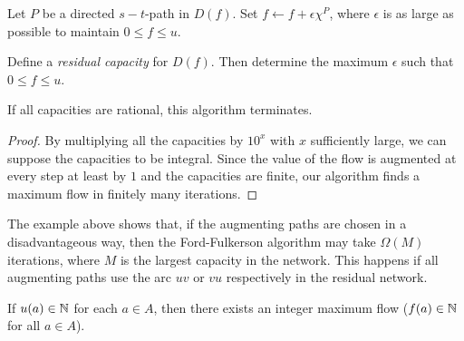 Let $P$ be a directed $s-t$-path in $D(f)$. Set $f \gets f + \epsilon\chi^P$, where
$\epsilon$ is as large as possible to maintain $0\leq f\leq u$. 

\begin{exercise}
   Define a \emph{residual capacity} for $D(f)$. Then determine 
   the maximum $\epsilon$ such that $0\leq f\leq u$.
\end{exercise}

\begin{theorem}
  \label{f:thr:9}
  If all capacities are rational, this algorithm terminates. 
\end{theorem}

\begin{proof}
   By multiplying all the capacities by $10^x$ with $x$ 
   sufficiently large, we can suppose the capacities to be 
   integral. Since the value of the flow is augmented at 
   every step at least by $1$ and the capacities are finite, our 
   algorithm finds a maximum flow in finitely many iterations.
\end{proof}


\begin{center}
\end{center}
The example above shows that, if the augmenting paths are chosen in a
disadvantageous way, then the Ford-Fulkerson algorithm may take $\Omega(M)$
iterations, where $M$ is the largest capacity in the network. This
happens if all augmenting paths use the arc $uv$ or $vu$ respectively
in the residual network. 




\begin{corollary}
  If $u(a) \in \mathbb{N}$ for each $a \in A$, then there exists an integer maximum
  flow ($f(a) \in \mathbb{N}$ for all $a \in A$). 
\end{corollary}


